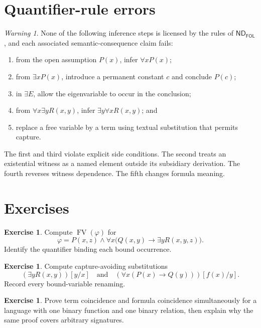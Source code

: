 \documentclass[11pt,oneside,openany]{book}
\theoremstyle{definition}
\newtheorem{exercise}[definition]{Exercise}
\theoremstyle{plain}
\theoremstyle{remark}
\newtheorem{warning}[definition]{Warning}
\newcommand{\FV}{\operatorname{FV}}
\newcommand{\ND}{\mathsf{ND}}
\newcommand{\FOL}{\mathsf{FOL}}
\begin{document}
\section{Quantifier-rule errors}
\label{sec:fol-deduction-04}

\begin{warning}
None of the following inference steps is licensed by the rules of
\(\ND_{\FOL}\), and each associated semantic-consequence claim fails:
\begin{enumerate}
  \item from the open assumption \(P(x)\), infer \(\forall xP(x)\);
  \item from \(\exists xP(x)\), introduce a permanent constant \(c\) and
        conclude \(P(c)\);
  \item in \(\exists E\), allow the eigenvariable to occur in the conclusion;
  \item from \(\forall x\exists yR(x,y)\), infer
        \(\exists y\forall xR(x,y)\); and
  \item replace a free variable by a term using textual substitution that
        permits capture.
\end{enumerate}
The first and third violate explicit side conditions.  The second treats an
existential witness as a named element outside its subsidiary derivation.  The
fourth reverses witness dependence.  The fifth changes formula meaning.
\end{warning}

\section{Exercises}
\label{sec:fol-deduction-05}

\begin{exercise}
\label{ex:fol-deduction-01}
Compute \(\FV(\varphi)\) for
\[
 \varphi=P(x,z)\land\forall x\bigl(Q(x,y)\to\exists yR(x,y,z)\bigr).
\]
Identify the quantifier binding each bound occurrence.
\end{exercise}

\begin{exercise}
\label{ex:fol-deduction-02}
Compute capture-avoiding substitutions
\[
 (\exists yR(x,y))[y/x]
 \quad\text{and}\quad
 (\forall x(P(x)\to Q(y)))[f(x)/y].
\]
Record every bound-variable renaming.
\end{exercise}

\begin{exercise}
\label{ex:fol-deduction-03}
Prove term coincidence and formula coincidence simultaneously for a language
with one binary function and one binary relation, then explain why the same
proof covers arbitrary signatures.
\end{exercise}
\end{document}
